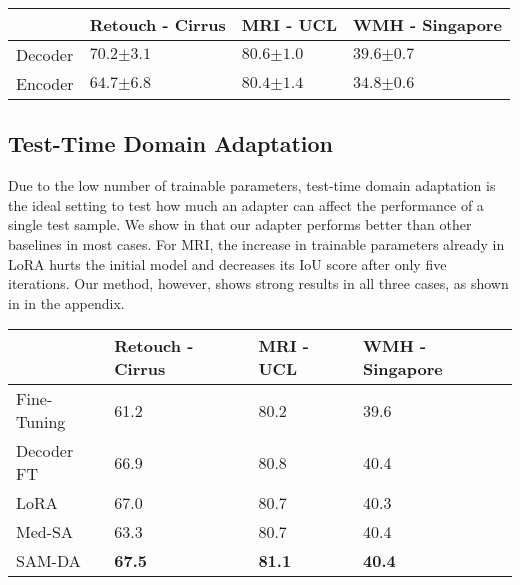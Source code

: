 \begin{table}[]
\centering
\begin{tabular}{@{}lP{3cm}P{2.5cm}P{3cm}@{}}
\toprule
 & Retouch - Cirrus & MRI - UCL & WMH - Singapore  \\ \midrule
Decoder & $\mathbf{70.2}{\scriptscriptstyle \pm 3.1}$ & $\mathbf{80.6}{\scriptscriptstyle \pm 1.0}$ & $\mathbf{39.6}{\scriptscriptstyle \pm 0.7}$ \\
Encoder & $64.7{\scriptscriptstyle \pm 6.8}$ & $80.4{\scriptscriptstyle \pm 1.4}$ & $34.8{\scriptscriptstyle \pm 0.6}$ \\ \bottomrule

\end{tabular}
\end{table}

\subsection{Test-Time Domain Adaptation}
Due to the low number of trainable parameters, test-time domain adaptation is the ideal setting to test how much an adapter can affect the performance of a single test sample. We show in  that our adapter performs better than other baselines in most cases. For MRI, the increase in trainable parameters already in LoRA hurts the initial model and decreases its IoU score after only five iterations. Our method, however, shows strong results in all three cases, as shown in  in the appendix.

\begin{table}[]
\centering
\begin{tabular}{@{}lP{2.5cm}P{2.5cm}P{3cm}@{}}
\toprule
 & Retouch - Cirrus & MRI - UCL & WMH - Singapore \\ \midrule
Fine-Tuning & 61.2 & 80.2 & 39.6 \\
Decoder FT & 66.9 & 80.8 & 40.4 \\
LoRA~\cite{hu2022lora} & 67.0 & 80.7 & 40.3 \\
Med-SA~\cite{wu2023medical} & 63.3 & 80.7 & 40.4 \\ \midrule
SAM-DA & \textbf{67.5} & \textbf{81.1} & \textbf{40.4} \\ \bottomrule
\end{tabular}
\end{table}

